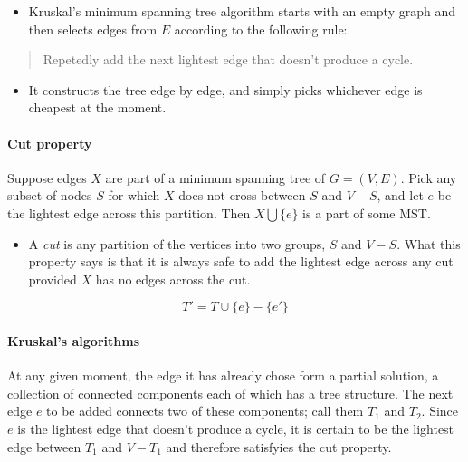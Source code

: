 \documentclass[a4paper,11pt]{article}
\begin{document}
\begin{itemize}
\itemsep1pt\parskip0pt
\item
  Kruskal's minimum spanning tree algorithm starts with an empty graph
  and then selects edges from $E$ according to the following rule:
\end{itemize}

\begin{quote}
Repetedly add the next lightest edge that doesn't produce a cycle.
\end{quote}

\begin{itemize}
\itemsep1pt\parskip0pt
\item
  It constructs the tree edge by edge, and simply picks whichever edge
  is cheapest at the moment.
\end{itemize}

\paragraph{Cut property}\label{cut-property}

\begin{description}
\itemsep1pt\parskip0pt
\item[Cut property]
Suppose edges $X$ are part of a minimum spanning tree of $G = (V, E)$.
Pick any subset of nodes $S$ for which $X$ does not cross between $S$
and $V - S$, and let $e$ be the lightest edge across this partition.
Then $X \bigcup \lbrace e \rbrace$ is a part of some MST.
\end{description}

\begin{itemize}
\itemsep1pt\parskip0pt
\item
  A \emph{cut} is any partition of the vertices into two groups, $S$ and
  $V - S$. What this property says is that it is always safe to add the
  lightest edge across any cut provided $X$ has no edges across the cut.
\end{itemize}

\[T' = T \cup \lbrace e \rbrace - \lbrace e' \rbrace\]

\paragraph{Kruskal's algorithms}\label{kruskals-algorithms}

At any given moment, the edge it has already chose form a partial
solution, a collection of connected components each of which has a tree
structure. The next edge $e$ to be added connects two of these
components; call them $T_1$ and $T_2$. Since $e$ is the lightest edge
that doesn't produce a cycle, it is certain to be the lightest edge
between $T_1$ and $V - T_1$ and therefore satisfyies the cut property.
\end{document}
